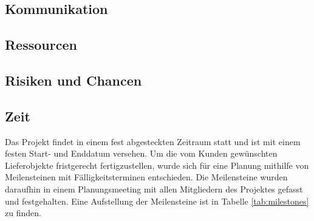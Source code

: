 \documentclass[12pt,oneside]{article}
\begin{document}
\subsection{Kommunikation}

\subsection{Ressourcen}

\subsection{Risiken und Chancen}

\subsection{Zeit}
Das Projekt findet in einem fest abgesteckten Zeitraum statt und ist mit einem festen Start- und Enddatum versehen.
Um die vom Kunden gewünschten Lieferobjekte fristgerecht fertigzustellen, wurde sich für eine Planung mithilfe von Meilensteinen mit
Fälligkeitsterminen entschieden. Die Meilensteine wurden daraufhin in einem Planungsmeeting mit allen Mitgliedern des Projektes gefasst und festgehalten.
Eine Aufstellung der Meilensteine ist in Tabelle \ref{tab:milestones} zu finden.\\
\end{document}
